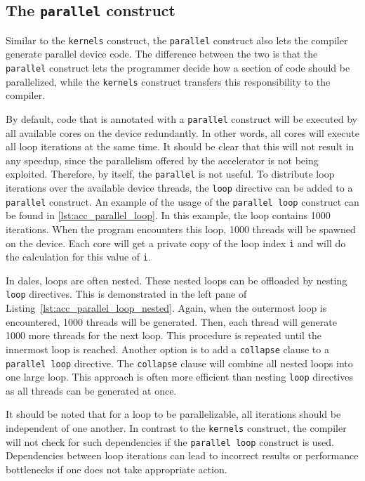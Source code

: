 \subsection{The \texttt{parallel} construct}
Similar to the \texttt{kernels} construct, the \texttt{parallel} construct also lets the compiler generate parallel device code. The difference between the two is that the \texttt{parallel} construct lets the programmer decide how a section of code should be parallelized, while the \texttt{kernels} construct transfers this responsibility to the compiler. 

By default, code that is annotated with a \texttt{parallel} construct will be executed by all available cores on the device redundantly. In other words, all cores will execute all loop iterations at the same time. It should be clear that this will not result in any speedup, since the parallelism offered by the accelerator is not being exploited. Therefore, by itself, the \texttt{parallel} is not useful. To distribute loop iterations over the available device threads, the \texttt{loop} directive can be added to a \texttt{parallel} construct. An example of the usage of the \texttt{parallel loop} construct can be found in \autoref{lst:acc_parallel_loop}. In this example, the loop contains 1000 iterations. When the program encounters this loop, 1000 threads will be spawned on the device. Each core will get a private copy of the loop index \texttt{i} and will do the calculation for this value of \texttt{i}. 

In \acrshort{dales}, loops are often nested. These nested loops can be offloaded by nesting \texttt{loop} directives. This is demonstrated in the left pane of Listing~\ref{lst:acc_parallel_loop_nested}. Again, when the outermost loop is encountered, 1000 threads will be generated. Then, each thread will generate 1000 more threads for the next loop. This procedure is repeated until the innermost loop is reached. Another option is to add a \texttt{collapse} clause to a \texttt{parallel loop} directive. The \texttt{collapse} clause will combine all nested loops into one large loop. This approach is often more efficient than nesting \texttt{loop} directives as all threads can be generated at once. 

It should be noted that for a loop to be parallelizable, all iterations should be independent of one another. In contrast to the \texttt{kernels} construct, the compiler will not check for such dependencies if the \texttt{parallel loop} construct is used. Dependencies between loop iterations can lead to incorrect results or performance bottlenecks if one does not take appropriate action. 


